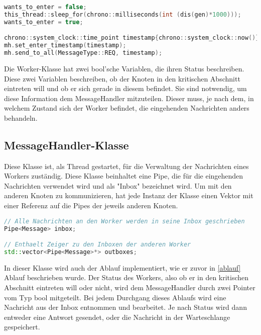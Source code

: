 \documentclass{article}
\begin{document}
\begin{minipage}{\linewidth}
\begin{lstlisting}[language=C++, caption=Zeitliche Regelung]
wants_to_enter = false;
this_thread::sleep_for(chrono::milliseconds(int (dis(gen)*1000)));
wants_to_enter = true;

chrono::system_clock::time_point timestamp{chrono::system_clock::now()};
mh.set_enter_timestamp(timestamp);
mh.send_to_all(MessageType::REQ, timestamp);

\end{lstlisting}
\end{minipage}

Die Worker-Klasse hat zwei bool'sche Variablen, die ihren Status beschreiben. Diese zwei Variablen beschreiben, ob der Knoten in den kritischen Abschnitt eintreten will und ob er sich gerade in diesem befindet. Sie sind notwendig, um diese Information dem MessageHandler mitzuteilen. Dieser muss, je nach dem, in welchem Zustand sich der Worker befindet, die eingehenden Nachrichten anders behandeln.

\subsection{MessageHandler-Klasse}
Diese Klasse ist, als Thread gestartet, für die Verwaltung der Nachrichten eines Workers zuständig. Diese Klasse beinhaltet eine Pipe, die für die eingehenden Nachrichten verwendet wird und als "Inbox" bezeichnet wird. Um mit den anderen Knoten zu kommunizieren, hat jede Instanz der Klasse einen Vektor mit einer Referenz auf die Pipes der jeweils anderen Knoten.

\begin{minipage}{\linewidth}
\begin{lstlisting}[language=C++, caption=Inbox und Outbox]
// Alle Nachrichten an den Worker werden in seine Inbox geschrieben
Pipe<Message> inbox;

// Enthaelt Zeiger zu den Inboxen der anderen Worker
std::vector<Pipe<Message>*> outboxes;

\end{lstlisting}
\end{minipage}

In dieser Klasse wird auch der Ablauf implementiert, wie er zuvor in \ref{ablauf} Ablauf beschrieben wurde. Der Status des Workers, also ob er in den kritischen Abschnitt eintreten will oder nicht, wird dem MessageHandler durch zwei Pointer vom Typ bool mitgeteilt. Bei jedem Durchgang dieses Ablaufs wird eine Nachricht aus der Inbox entnommen und bearbeitet. Je nach Status wird dann entweder eine Antwort gesendet, oder die Nachricht in der Warteschlange gespeichert.
\end{document}
